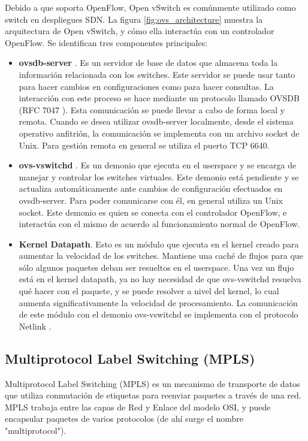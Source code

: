 Debido a que soporta OpenFlow, Open vSwitch es comúnmente utilizado como switch en despliegues SDN. La figura \ref{fig:ovs_architecture} muestra la arquitectura de Open vSwitch, y cómo ella interactúa con un controlador OpenFlow. Se identifican tres componentes principales:
\begin{itemize}
	\item \textbf{ovsdb-server} \cite{ovsdb-server}. Es un servidor de base de datos que almacena toda la información relacionada con los switches. Este servidor se puede usar tanto para hacer cambios en configuraciones como para hacer consultas. La interacción con este proceso se hace mediante un protocolo llamado OVSDB (RFC 7047 \cite{ovsdb-rfc}). Esta comunicación se puede llevar a cabo de forma local y remota. Cuando se desea utilizar ovsdb-server localmente, desde el sistema operativo anfitrión, la comunicación se implementa con un archivo socket de Unix. Para gestión remota en general se utiliza el puerto TCP 6640.
	\item \textbf{ovs-vswitchd} \cite{ovs-vswitchd}. Es un demonio que ejecuta en el userspace y se encarga de manejar y controlar los switches virtuales. Este demonio está pendiente y se actualiza automáticamente ante cambios de configuración efectuados en ovsdb-server. Para poder comunicarse con él, en general utiliza un Unix socket.
	Este demonio es quien se conecta con el controlador OpenFlow, e interactúa con el mismo de acuerdo al funcionamiento normal de OpenFlow.
	\item \textbf{Kernel Datapath}. Esto es un módulo que ejecuta en el kernel creado para aumentar la velocidad de los switches. Mantiene una caché de flujos para que sólo algunos paquetes deban ser resueltos en el userspace. Una vez un flujo está en el kernel datapath, ya no hay necesidad de que ovs-vswitchd resuelva qué hacer con el paquete, y se puede resolver a nivel del kernel, lo cual aumenta significativamente la velocidad de procesamiento. La comunicación de este módulo con el demonio ovs-vswitchd se implementa con el protocolo Netlink \cite{netlink}.
\end{itemize}

\subsection{Multiprotocol Label Switching (MPLS)}
Multiprotocol Label Switching (MPLS) es un mecanismo de transporte de datos que utiliza conmutación de etiquetas para reenviar paquetes a través de una red. MPLS trabaja entre las capas de Red y Enlace del modelo OSI, y puede encapsular paquetes de varios protocolos (de ahí surge el nombre "multiprotocol").

